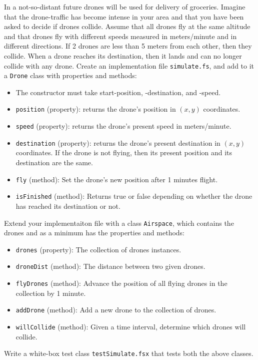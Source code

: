 In a not-so-distant future drones will be used for delivery of groceries. Imagine that the drone-traffic has become intense in your area and that you have been asked to decide if drones collide. Assume that all drones fly at the same altitude and that drones fly with different speeds measured in meters/minute and in different directions. If 2 drones are less than 5 meters from each other, then they collide. When a drone reaches its destination, then it lands and can no longer collide with any drone. Create an implementation file \lstinline{simulate.fs}, and add to it a \lstinline{Drone} class with properties and methods:
\begin{itemize}
\item The constructor must take start-position, -destination, and -speed.
\item \lstinline{position} (property): returns the drone's position in $(x, y)$ coordinates.
\item \lstinline{speed} (property): returns the drone's present speed in meters/minute.
\item \lstinline{destination} (property): returns the drone's present destination in $(x, y)$ coordinates. If the drone is not flying, then its present position and its destination are the same.
\item \lstinline{fly} (method): Set the drone's new position after 1 minutes flight.
\item \lstinline{isFinished} (method): Returns true or false depending on whether the drone has reached its destination or not.
\end{itemize}

Extend your implementaiton file with a class \lstinline{Airspace}, which contains the drones and as a minimum has the properties and methods:
\begin{itemize}
\item \lstinline{drones} (property): The collection of drones instances.
\item \lstinline{droneDist} (method): The distance between two given drones.
\item \lstinline{flyDrones} (method): Advance the position of all flying drones in the collection by 1 minute.
\item \lstinline{addDrone} (method): Add a new drone to the collection of drones.
\item \lstinline{willCollide} (method): Given a time interval, determine which drones will collide.
\end{itemize}

Write a white-box test class \lstinline{testSimulate.fsx} that tests both the above classes.
